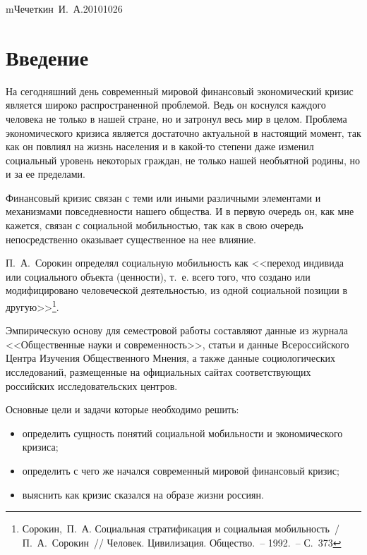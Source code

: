 


    {m}{Чечеткин~И.~А.}{20101026}
  \onehalfspacing
  \setcounter{page}{2}
  \tableofcontents

  \newpage

  \section*{Введение}
  На сегодняшний день современный мировой финансовый экономический кризис
  является широко распространенной проблемой. Ведь он коснулся каждого человека
  не только в нашей стране, но и затронул весь мир в целом. Проблема
  экономического кризиса является достаточно актуальной в настоящий момент, так
  как он повлиял на жизнь населения и в какой-то степени даже изменил
  социальный уровень некоторых граждан, не только нашей необъятной родины, но и
  за ее пределами.

  Финансовый кризис связан с теми или иными различными элементами и механизмами
  повседневности нашего общества. И в первую очередь он, как мне кажется,
  связан с социальной мобильностью, так как в свою очередь непосредственно
  оказывает существенное на нее влияние.

  П.~А.~Сорокин определял социальную мобильность как << переход
  индивида или социального объекта (ценности), т.~е. всего того, что создано
  или модифицировано человеческой деятельностью, из одной социальной позиции в
  другую>>\footnote{Сорокин,~П.~А. Социальная стратификация и социальная
  мобильность~/ П.~А.~Сорокин~// Человек. Цивилизация. Общество.~-- 1992.~--
  С.~373}.

  Эмпирическую основу для семестровой работы составляют данные из журнала
  <<Общественные науки и современность>>, статьи и данные Всероссийского Центра
  Изучения Общественного Мнения, а также данные социологических исследований,
  размещенные на официальных сайтах соответствующих российских исследовательских
  центров.

  Основные цели и задачи которые необходимо решить:
  \begin{itemize}
    \item определить сущность понятий социальной мобильности и экономического
      кризиса;
    \item определить с чего же начался современный мировой финансовый кризис;
    \item выяснить как кризис сказался на образе жизни россиян.
  \end{itemize}

